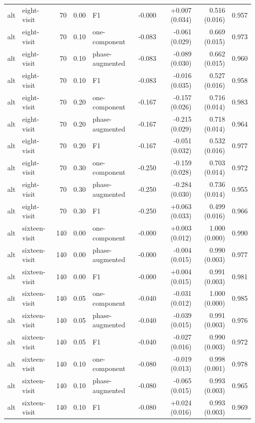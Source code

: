 \documentclass[
  11pt,
]{article}
\begin{document}
\begin{longtable}[t]{llrrlrrrr}
alt & eight-visit & 70 & 0.00 & F1 & -0.000 & +0.007 (0.034) & 0.516 (0.016) & 0.957\\
\addlinespace
alt & eight-visit & 70 & 0.10 & one-component & -0.083 & -0.061 (0.029) & 0.669 (0.015) & 0.973\\
alt & eight-visit & 70 & 0.10 & phase-augmented & -0.083 & -0.089 (0.030) & 0.662 (0.015) & 0.960\\
alt & eight-visit & 70 & 0.10 & F1 & -0.083 & -0.016 (0.035) & 0.527 (0.016) & 0.958\\
alt & eight-visit & 70 & 0.20 & one-component & -0.167 & -0.157 (0.026) & 0.716 (0.014) & 0.983\\
alt & eight-visit & 70 & 0.20 & phase-augmented & -0.167 & -0.215 (0.029) & 0.718 (0.014) & 0.964\\
\addlinespace
alt & eight-visit & 70 & 0.20 & F1 & -0.167 & -0.051 (0.032) & 0.532 (0.016) & 0.977\\
alt & eight-visit & 70 & 0.30 & one-component & -0.250 & -0.159 (0.028) & 0.703 (0.014) & 0.972\\
alt & eight-visit & 70 & 0.30 & phase-augmented & -0.250 & -0.284 (0.030) & 0.736 (0.014) & 0.955\\
alt & eight-visit & 70 & 0.30 & F1 & -0.250 & +0.063 (0.033) & 0.499 (0.016) & 0.966\\
alt & sixteen-visit & 140 & 0.00 & one-component & -0.000 & +0.003 (0.012) & 1.000 (0.000) & 0.990\\
\addlinespace
alt & sixteen-visit & 140 & 0.00 & phase-augmented & -0.000 & -0.004 (0.015) & 0.990 (0.003) & 0.977\\
alt & sixteen-visit & 140 & 0.00 & F1 & -0.000 & +0.004 (0.015) & 0.991 (0.003) & 0.981\\
alt & sixteen-visit & 140 & 0.05 & one-component & -0.040 & -0.031 (0.012) & 1.000 (0.000) & 0.985\\
alt & sixteen-visit & 140 & 0.05 & phase-augmented & -0.040 & -0.039 (0.015) & 0.991 (0.003) & 0.976\\
alt & sixteen-visit & 140 & 0.05 & F1 & -0.040 & -0.027 (0.016) & 0.990 (0.003) & 0.972\\
\addlinespace
alt & sixteen-visit & 140 & 0.10 & one-component & -0.080 & -0.019 (0.013) & 0.998 (0.001) & 0.978\\
alt & sixteen-visit & 140 & 0.10 & phase-augmented & -0.080 & -0.065 (0.015) & 0.993 (0.003) & 0.965\\
alt & sixteen-visit & 140 & 0.10 & F1 & -0.080 & +0.024 (0.016) & 0.993 (0.003) & 0.969\\

\end{longtable}
\end{document}
